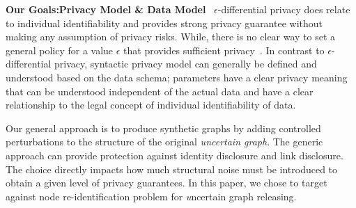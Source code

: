 \textbf{Our Goals:Privacy Model \& Data Model}~
$\epsilon$-differential privacy does relate to individual identifiability and provides strong privacy guarantee without making any assumption of privacy risks. While, there is no clear way to set a general policy for a value $\epsilon$ that provides sufficient privacy~\cite{lee2011}. In contrast to $\epsilon$-differential privacy, syntactic privacy model can generally be defined and understood based on the data schema; parameters have a clear privacy meaning that can be understood independent of the actual data and have a clear relationship to the legal concept of individual identifiability of data.  

Our general approach is to produce synthetic graphs by adding controlled perturbations to the structure of the original \emph{uncertain graph}. The generic approach can provide protection against identity disclosure and link disclosure. The choice directly impacts how much structural noise must be introduced to obtain a given level of privacy guarantees. In this paper, we chose to target against node re-identification problem for {\emph uncertain graph} releasing.  